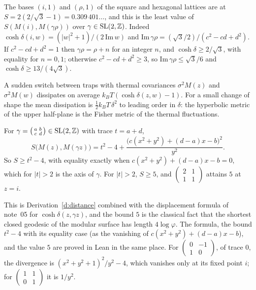 \documentclass[11pt]{article}
\begin{document}
The bases $(i,1)$ and $(\rho,1)$ of the square and hexagonal lattices are at $S = 2(2/\sqrt3-1) = 0.309\,401\ldots$, and this is the least value of $S(M(i),M(\gamma\rho))$ over $\gamma\in\mathrm{SL}(2,\mathbb{Z})$.
Indeed $\cosh\delta(i,w) = (|w|^2+1)/(2\,\mathrm{Im}\,w)$ and $\mathrm{Im}\,\gamma\rho = (\sqrt3/2)/(c^2-cd+d^2)$.
If $c^2-cd+d^2 = 1$ then $\gamma\rho = \rho+n$ for an integer $n$, and $\cosh\delta\ge2/\sqrt3$, with equality for $n = 0, 1$; otherwise $c^2-cd+d^2\ge3$, so $\mathrm{Im}\,\gamma\rho\le\sqrt3/6$ and $\cosh\delta\ge13/(4\sqrt3)$.

\physical
A sudden switch between traps with thermal covariances $\sigma^2M(z)$ and $\sigma^2M(w)$ dissipates on average $k_BT(\cosh\delta(z,w)-1)$.
For a small change of shape the mean dissipation is $\tfrac12k_BT\,\delta^2$ to leading order in $\delta$: the hyperbolic metric of the upper half-plane is the Fisher metric of the thermal fluctuations.

\begin{derivation}\label{d:basis}
For $\gamma = \left(\begin{smallmatrix}a&b\\c&d\end{smallmatrix}\right)\in\mathrm{SL}(2,\mathbb{Z})$ with trace $t = a+d$,
\[
  S\bigl(M(z),M(\gamma z)\bigr) = t^2-4+\frac{\bigl(c(x^2+y^2)+(d-a)x-b\bigr)^2}{y^2}.
\]
So $S\ge t^2-4$, with equality exactly when $c(x^2+y^2)+(d-a)x-b = 0$, which for $|t|>2$ is the axis of $\gamma$.
For $|t|>2$, $S\ge5$, and $\left(\begin{smallmatrix}2&1\\1&1\end{smallmatrix}\right)$ attains $5$ at $z=i$.
\end{derivation}

\noindent
This is Derivation~\ref{d:distance} combined with the displacement formula of note~05 for $\cosh\delta(z,\gamma z)$, and the bound $5$ is the classical fact that the shortest closed geodesic of the modular surface has length $4\log\varphi$.
The formula, the bound $t^2-4$ with its equality case (as the vanishing of $c(x^2+y^2)+(d-a)x-b$), and the value $5$ are proved in Lean in the same place.
For $\left(\begin{smallmatrix}0&-1\\1&0\end{smallmatrix}\right)$, of trace $0$, the divergence is $(x^2+y^2+1)^2/y^2-4$, which vanishes only at its fixed point $i$; for $\left(\begin{smallmatrix}1&1\\0&1\end{smallmatrix}\right)$ it is $1/y^2$.
\end{document}
